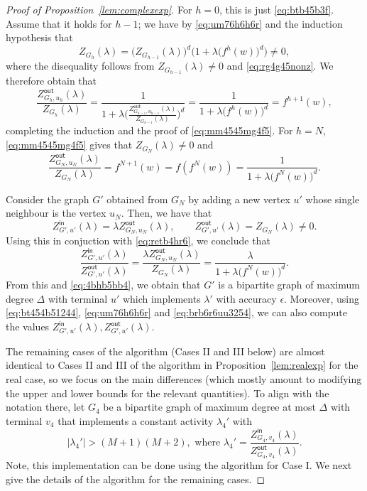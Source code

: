 \documentclass[11pt]{article}
\def\Zin{Z^{\mathsf{in}}}
\def\Zout{Z^{\mathsf{out}}}
\newcommand{\fn}[2]{#1^{#2}}
\begin{document}
\begin{proof}[Proof of Proposition~\ref{lem:complexexp}]
For $h=0$, this is just \eqref{eq:btb45b3f}. Assume that it holds for $h-1$; we have by \eqref{eq:um76h6h6r} and the induction hypothesis that 
\[Z_{G_h}(\lambda)=\big(Z_{G_{h-1}}(\lambda)\big)^{d}\Big(1+\lambda (\fn{f}{h}(w)\big)^d\Big)\neq 0,\]
where the disequality follows from $Z_{G_{h-1}}(\lambda)\neq0$ and \eqref{eq:rg4g45nonz}. We therefore obtain that
\[\frac{\Zout_{G_h,u_h}(\lambda)}{Z_{G_h}(\lambda)}=\frac{1}{1+\lambda \Big(\frac{\Zout_{G_{h-1},u_{h-1}}(\lambda)}{Z_{G_{h-1}}(\lambda)}\Big)^d}=\frac{1}{1+\lambda \big(\fn{f}{h}(w)\big)^d}=\fn{f}{h+1}(w),\]
completing the induction and the proof of \eqref{eq:mm4545mg4f5}. For $h=N$, \eqref{eq:mm4545mg4f5} gives  that $Z_{G_N}(\lambda)\neq 0$ and 
\begin{equation}\label{eq:retb4hr6}
\frac{\Zout_{G_{N},u_{N}}(\lambda)}{Z_{G_{N}}(\lambda)}=\fn{f}{N+1}(w)=f(\fn{f}{N}(w))=\frac{1}{1+\lambda \big(\fn{f}{N}(w)\big)^d}.
\end{equation}

Consider the graph $G'$ obtained from $G_{N}$ by adding a new vertex $u'$ whose
single neighbour is the vertex $u_{N}$. Then, we have that
\begin{equation}\label{eq:brb6r6uu3254}
\Zin_{G',u'}(\lambda)= \lambda\Zout_{G_{N},u_{N}}(\lambda),\qquad \Zout_{G',u'}(\lambda)=Z_{G_{N}}(\lambda)\neq 0.
\end{equation}
Using this in conjuction with \eqref{eq:retb4hr6}, we conclude that
\[\frac{\Zin_{G',u'}(\lambda)}{\Zout_{G',u'}(\lambda)}=\frac{\lambda\Zout_{G_{N},u_{N}}(\lambda)}{Z_{G_{N}}(\lambda)}=\frac{\lambda}{1+\lambda \big(\fn{f}{N}(w)\big)^d}.\]
From this and \eqref{eq:4bhb5bb4}, we obtain that $G'$ is a bipartite graph of maximum degree $\Delta$ with terminal $u'$ which implements $\lambda'$ with accuracy $\epsilon$. Moreover, using \eqref{eq:bt454b51244}, \eqref{eq:um76h6h6r} and \eqref{eq:brb6r6uu3254}, we can also compute the values $\Zin_{G',u'}(\lambda),\Zout_{G',u'}(\lambda)$.

\vskip 0.2cm

\noindent The remaining cases of the algorithm (Cases II and III below) are almost identical to Cases II and III of the algorithm in Proposition~\ref{lem:realexp} for the real case, so we focus on the main differences (which mostly amount to modifying the upper and lower bounds for the relevant quantities). To align  with the notation there, let $G_4$ be a bipartite graph of maximum degree at most $\Delta$ with terminal $v_4$ that implements a constant activity $\lambda_4'$ with 
\begin{equation}\label{eq:56g56g4g543ww}
|\lambda_4'|>(M+1)(M+2), \mbox{ where } \lambda_4'=\frac{\Zin_{G_4,v_4}(\lambda)}{\Zout_{G_4,v_4}(\lambda)}.
\end{equation}
Note, this implementation can be done using the algorithm for Case I. We next  give the details of the algorithm for the remaining cases. 
\vskip 0.2cm


\end{proof}
\end{document}
